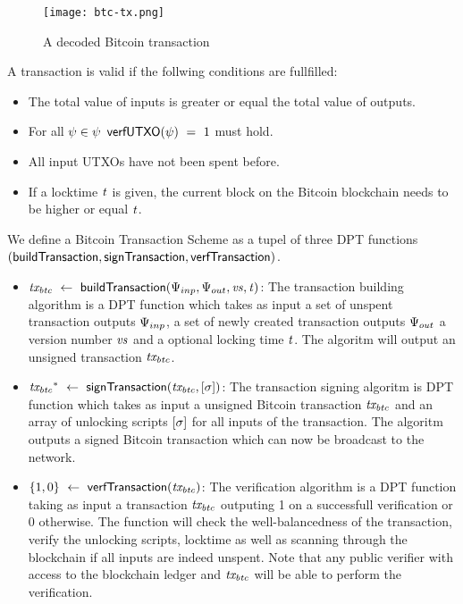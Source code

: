 \begin{figure}
    \begin{center}
        \texttt{[image: btc-tx.png]}
    \end{center}
    \caption{A decoded Bitcoin transaction} \label{fig:btc-tx}
\end{figure}

A transaction is valid if the follwing conditions are fullfilled:

\begin{itemize}
    \item The total value of inputs is greater or equal the total value of outputs.
    \item For all $\psi \in \psi$ $\mathsf{verfUTXO}(\psi) ~=~ 1$ must hold.
    \item All input UTXOs have not been spent before.
    \item If a locktime $\mathit{t}$ is given, the current block on the Bitcoin blockchain needs to be higher or equal $\mathit{t}$.
\end{itemize}

\begin{definition}
    We define a Bitcoin Transaction Scheme as a tupel of three DPT functions $(\mathsf{buildTransaction},
    \mathsf{signTransaction}, \mathsf{verfTransaction})$.
    \begin{itemize}
        \item $\mathit{tx_{btc}} ~\leftarrow~ \mathsf{buildTransaction}(\Psi_{inp},\Psi_{out},\mathit{vs},\mathit{t})$: The
        transaction building algorithm is a DPT function which takes as input a set of unspent transaction outputs
        $\Psi_{inp}$, a set of newly created transaction outputs $\Psi_{out}$ a version number $\mathit{vs}$
        and a optional locking time $\mathit{t}$. The algoritm will output an unsigned transaction $\mathit{tx_{btc}}$.
        \item $\mathit{tx_{btc}}^* ~\leftarrow~ \mathsf{signTransaction} (\mathit{tx_{btc}},[\mathit{\sigma}])$: The transaction
        signing algoritm is DPT function which takes as input a unsigned Bitcoin transaction $\mathit{tx_{btc}}$ and an array
        of unlocking scripts $[\mathit{\sigma}]$ for all inputs of the transaction. The algoritm outputs a
        signed Bitcoin transaction which can now be broadcast to the network.
        \item $\{ 1,0 \} ~\leftarrow~ \mathsf{verfTransaction}(\mathit{tx_{btc}})$: The verification algorithm is a DPT function
        taking as input a transaction $\mathit{tx_{btc}}$ outputing 1 on a successfull verification or 0 otherwise. The
        function will check the well-balancedness of the transaction, verify the unlocking scripts, locktime
        as well as scanning through the blockchain if all inputs are indeed unspent.
        Note that any public verifier with access to the blockchain ledger and $\mathit{tx_{btc}}$ will be able to perform the verification.
    \end{itemize}
\end{definition}

